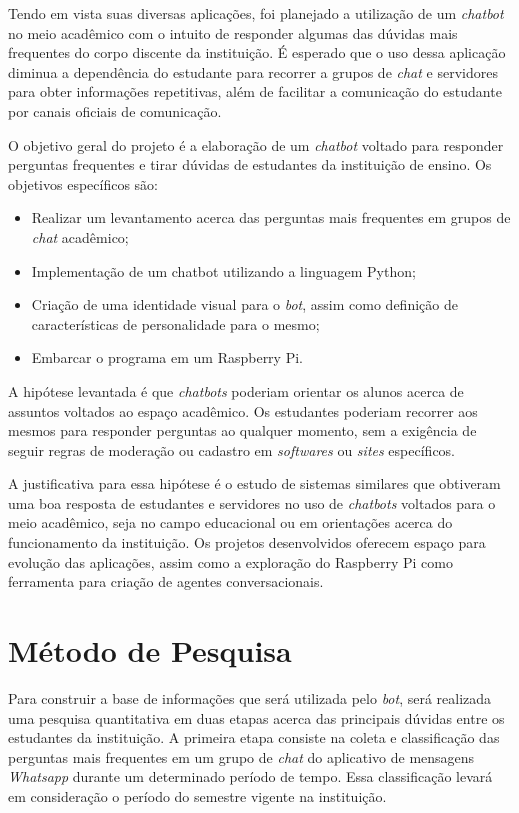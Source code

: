 \documentclass[12pt]{article}
\begin{document}
Tendo em vista suas diversas aplicações, foi planejado a utilização de um {\itshape chatbot} no meio acadêmico com o intuito de responder algumas das dúvidas mais frequentes do corpo discente da instituição. É esperado que o uso dessa aplicação diminua a dependência do estudante para recorrer a grupos de {\itshape chat} e servidores para obter informações repetitivas, além de facilitar a comunicação do estudante por canais oficiais de comunicação.

O objetivo geral do projeto é a elaboração de um {\itshape chatbot} voltado para responder perguntas frequentes e tirar dúvidas de estudantes da instituição de ensino. Os objetivos específicos são: 


\begin{itemize}
  \item Realizar um levantamento acerca das perguntas mais frequentes em grupos de {\itshape chat} acadêmico;
  \item Implementação de um chatbot utilizando a linguagem Python;
  \item Criação de uma identidade visual para o {\itshape bot}, assim como definição de características de personalidade para o mesmo;
  \item Embarcar o programa em um Raspberry Pi.
\end{itemize}

A hipótese levantada é que {\itshape chatbots} poderiam orientar os alunos acerca de assuntos voltados ao espaço acadêmico. Os estudantes poderiam recorrer aos mesmos para responder perguntas ao qualquer momento, sem a exigência de seguir regras de moderação ou cadastro em {\itshape softwares} ou {\itshape sites} específicos.

A justificativa para essa hipótese é o estudo de sistemas similares que obtiveram uma boa resposta de estudantes e servidores no uso de {\itshape chatbots} voltados para o meio acadêmico, seja no campo educacional ou em orientações acerca do funcionamento da instituição. Os projetos desenvolvidos oferecem espaço para evolução das aplicações, assim como a exploração do Raspberry Pi como ferramenta para criação de agentes conversacionais.

\section{ Método de Pesquisa }

Para construir a base de informações que será utilizada pelo {\itshape bot}, será realizada uma pesquisa quantitativa em duas etapas acerca das principais dúvidas entre os estudantes da instituição. A primeira etapa consiste na coleta e classificação das perguntas mais frequentes em um grupo de {\itshape chat} do aplicativo de mensagens {\itshape Whatsapp} durante um determinado período de tempo. Essa classificação levará em consideração o período do semestre vigente na instituição.
\end{document}

